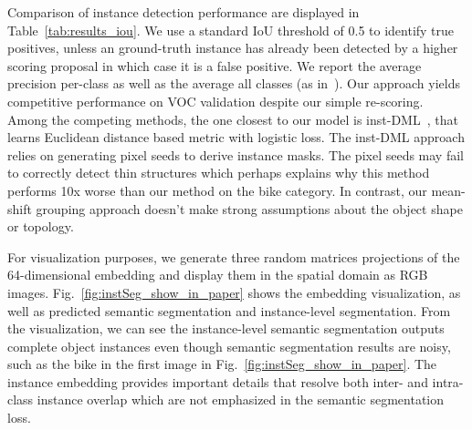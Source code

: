 Comparison of instance detection performance are displayed in
Table~\ref{tab:results_iou}.  We use a standard IoU threshold of 0.5 to
identify true positives, unless an ground-truth instance has already been
detected by a higher scoring proposal in which case it is a false positive.  We
report the average precision per-class as well as the average all classes (as
in~\cite{hariharan2011semantic}).  Our approach yields competitive performance
on VOC validation despite our simple re-scoring.  Among the competing methods,
the one closest to our model is inst-DML~\cite{fathi2017semantic}, that learns
Euclidean distance based metric with logistic loss.  The inst-DML approach
relies on generating pixel seeds to derive instance masks.  The pixel seeds may
fail to correctly detect thin structures which perhaps explains why this method
performs 10x worse than our method on the bike category. In contrast, our
mean-shift grouping approach doesn't make strong assumptions about the
object shape or topology.

For visualization purposes, we generate three random matrices projections of
the 64-dimensional embedding and display them in the spatial domain as RGB
images.  Fig.~\ref{fig:instSeg_show_in_paper} shows the embedding
visualization, as well as predicted semantic segmentation and instance-level
segmentation.  From the visualization, we can see the instance-level semantic
segmentation outputs complete object instances even though semantic
segmentation results are noisy, such as the bike in the first image in
Fig.~\ref{fig:instSeg_show_in_paper}. The instance embedding provides
important details that resolve both inter- and intra-class instance overlap
which are not emphasized in the semantic segmentation loss.



